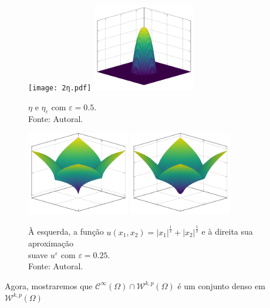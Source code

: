 \documentclass[a4paper, 11pt]{book}
\theoremstyle{definition}
\newcommand{\cC}{\mathcal{C}}
\newcommand{\cW}{\mathcal{W}}
\begin{document}
\begin{ex}
    \begin{figure}
        \centering
        \texttt{[image: 2η.pdf]}
        \hspace{10mm}
        \includegraphics[width=0.4\textwidth]{2ηε.pdf}
        \caption{$\eta$ e $\eta_\varepsilon$ com $\varepsilon = 0.5$.\\Fonte: Autoral.}
        \label{fig:eta-R2}
    \end{figure}

    \begin{figure}
        \centering
        \includegraphics[width=0.4\textwidth]{u.pdf}
        \hspace{10mm}
        \includegraphics[width=0.4\textwidth]{uε2.pdf}
        \caption{À esquerda, a função $u(x_1,x_2) = |x_1|^{\frac{1}{2}} + |x_2|^{\frac{1}{2}}$ e à direita sua aproximação\\suave $u^\varepsilon$ com $\varepsilon = 0.25$.\\Fonte: Autoral.}
        \label{fig:aproximacao-suave-R2}
    \end{figure}
\end{ex}

Agora, mostraremos que $\cC^{\infty}(\Omega) \cap \cW^{k,p}(\Omega)$ é um conjunto denso em $\cW^{k,p}(\Omega)$
\end{document}
